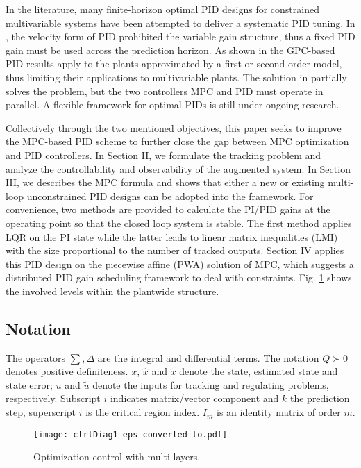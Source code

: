 \documentclass[5p,authoryear,times]{elsarticle}
\begin{document}
In the literature, many finite-horizon optimal PID designs for constrained multivariable systems have been attempted to deliver a systematic PID tuning. In \citet{Mor03}, the velocity form of PID prohibited the variable gain structure, thus a fixed PID gain must be used across the prediction horizon. As shown in \citet{Camacho03Model,Aro08,Sat12} the GPC-based PID results apply to the plants approximated by a first or second order model, thus limiting their applications to multivariable plants. The solution in \citet{Di10Model} partially solves the problem, but the two controllers MPC and PID must operate in parallel. A flexible framework for optimal PIDs is still under ongoing research.

Collectively through the two mentioned objectives, this paper seeks to improve the MPC-based PID scheme to further close the gap between MPC optimization and PID controllers. In Section II, we formulate the tracking problem and analyze the controllability and observability of the augmented system. In Section III, we describes the MPC formula and shows that either a new or existing multi-loop unconstrained PID designs can be adopted into the framework. For convenience, two methods are provided to calculate the PI/PID gains at the operating point so that the closed loop system is stable. The first method applies LQR on the PI state while the latter leads to linear matrix inequalities (LMI) with the size proportional to the number of tracked outputs. Section IV applies this PID design on the piecewise affine (PWA) solution of MPC, which suggests a distributed PID gain scheduling framework to deal with constraints. Fig. \ref{fig1} shows the involved levels within the plantwide structure.

\subsection*{Notation}
The operators $\sum, \Delta$ are the integral and differential terms. The notation $Q \succ 0$ denotes positive definiteness. $x$, $\hat{x}$ and $\tilde{x}$ denote the state, estimated state and state error; $u$ and $\tilde{u}$ denote the inputs for tracking and regulating problems, respectively. Subscript $i$ indicates matrix/vector component and $k$ the prediction step, superscript $i$ is the critical region index. $I_m$ is an identity matrix of order $m$. 

\begin{figure}[t]
\centering
\texttt{[image: ctrlDiag1-eps-converted-to.pdf]}
\caption{Optimization control with multi-layers.}
\label{fig1}
\end{figure}
\end{document}
